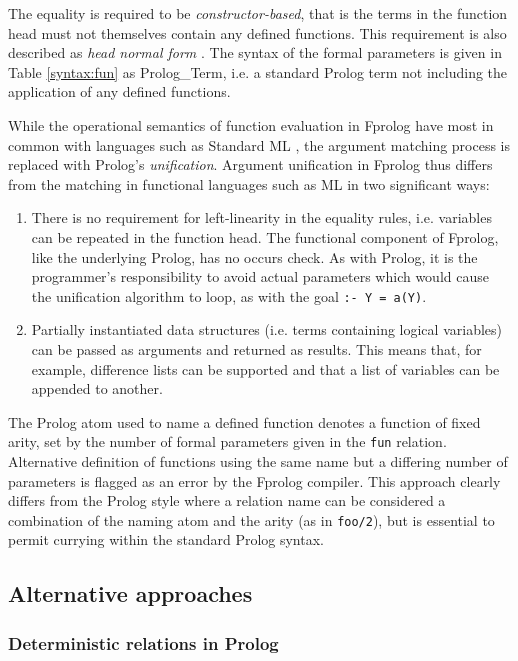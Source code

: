 \documentclass[a4paper,11pt,twoside]{article}
\begin{document}
The equality is required to be \textit{constructor-based}, that is the terms in the
function head must not themselves contain any defined functions. 
This requirement is also described as \textit{head normal form} \cite{HAK+97}.
The syntax of the
formal parameters is given in Table \ref{syntax:fun} as Prolog\_{}Term, i.e. a
standard Prolog term not including the application of any defined functions.

While the operational semantics of function evaluation in Fprolog 
have most in common with
languages such as Standard ML \cite{Pau91, MTH90}, the argument matching process is
replaced with Prolog's \textit{unification}.  Argument unification in Fprolog thus
differs from the matching in functional languages such as ML in two significant
ways:
\begin{enumerate}
\item{There is no requirement for left-linearity
  in the equality rules, i.e. variables can be repeated in the function head.  The
  functional component of Fprolog, like the underlying Prolog, has no occurs check.
  As with Prolog, it is the programmer's responsibility to avoid actual parameters which
  would cause the unification algorithm to loop, as with the goal \texttt{:- Y = a(Y)}.}
\item{Partially instantiated data structures (i.e. terms
  containing logical variables) can be passed as arguments and returned as results.
  This means that, for example, difference lists can be supported and that a list of 
  variables can be appended to another.}
\end{enumerate}
The Prolog atom used to name a defined function denotes a function of fixed arity, set
by the number of formal parameters given in the \texttt{fun} relation.  Alternative
definition of functions using the same name but a differing number of parameters is
flagged as an error by the Fprolog compiler.  This approach clearly differs from the
Prolog style where a relation name can be considered a combination of the naming
atom and the arity (as in \texttt{foo/2}), but is essential to permit currying within
the standard Prolog syntax.

\subsection{Alternative approaches}

\subsubsection{Deterministic relations in Prolog}
\end{document}
